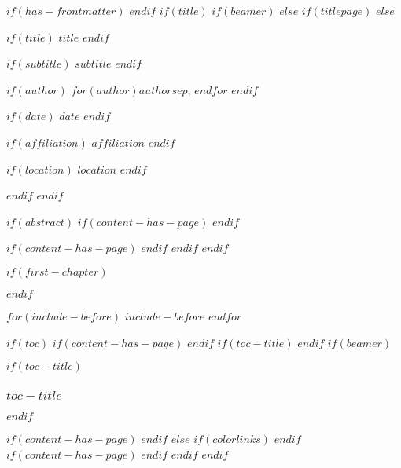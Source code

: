 \documentclass[
$if(fontsize)$
  $fontsize$,
$endif$
$if(lang)$
  $babel-lang$,
$endif$
$if(papersize)$
  $papersize$paper,
$endif$
$if(beamer)$
  ignorenonframetext,
$if(handout)$
  handout,
$endif$
$if(aspectratio)$
  aspectratio=$aspectratio$,
$endif$
$endif$
$for(classoption)$
  $classoption$$sep$,
$endfor$
]{$documentclass$}
\begin{document}
$if(has-frontmatter)$
\frontmatter
$endif$
$if(title)$
$if(beamer)$
\frame{\titlepage}
$else$
$if(titlepage)$
$else$


{\color{titlepageTextColor}
\begin{center}
\vspace{0.5cm}
$if(title)$
\huge{\uppercase{\textbf{$title$}}}
\vspace{0.2cm}
$endif$

$if(subtitle)$
\Large{$subtitle$}
$endif$
\vspace{0.4cm}

$if(author)$
\large{\textsf{$for(author)$$author$$sep$, $endfor$}}
\vspace{0.2cm}
$endif$

$if(date)$
\large{\uppercase{$date$}}
\vspace{0.4cm}
$endif$

$if(affiliation)$
\large{ $affiliation$}
\vspace{0.1cm}
$endif$

$if(location)$
\large{$location$}
$endif$
\vspace{0.5cm}
\end{center}
}

$endif$
$endif$


$if(abstract)$
$if(content-has-page)$
\thispagestyle{empty}
$endif$
\begin{abstract}
$abstract$
\end{abstract}
$if(content-has-page)$
\newpage
$endif$
$endif$
$endif$

$if(first-chapter)$
\setcounter{chapter}{$first-chapter$}
\addtocounter{chapter}{-1}
$endif$


$for(include-before)$
$include-before$
$endfor$

$if(toc)$
$if(content-has-page)$
\thispagestyle{empty}
$endif$
$if(toc-title)$
\renewcommand*\contentsname{$toc-title$}
$endif$
$if(beamer)$
\begin{frame}[allowframebreaks]
$if(toc-title)$
  \frametitle{$toc-title$}
$endif$
  \tableofcontents[hideallsubsections]
\end{frame}
$if(content-has-page)$
\newpage
$endif$
$else$
{
$if(colorlinks)$
\hypersetup{linkcolor=$if(toccolor)$$toccolor$$else$$endif$}
$endif$
\setcounter{tocdepth}{$toc-depth$}
\tableofcontents
$if(content-has-page)$
\newpage
$endif$
}
$endif$
$endif$
\end{document}
